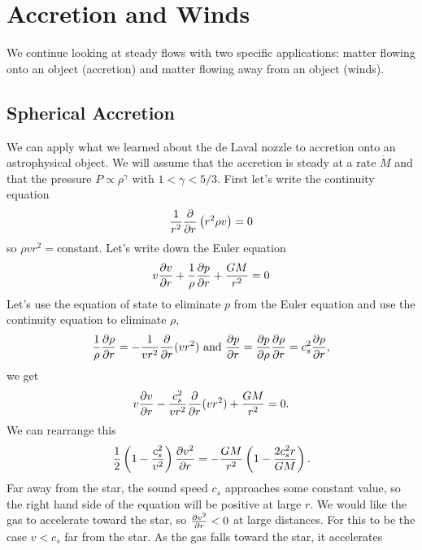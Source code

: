 \chapter{Accretion and Winds}
\label{cha:accretion-winds}
We continue looking at steady flows with two specific applications:
matter flowing onto an object (accretion) and matter flowing away from
an object (winds). 

\section{Spherical Accretion}
\label{sec:spherical-accretion}
We can apply what we learned about the de Laval nozzle to accretion
onto an astrophysical object.  We will assume that the accretion is
steady at a rate ${\dot M}$ and that the pressure $P \propto
\rho^\gamma$ with $1 < \gamma < 5/3$.   First let's write the
continuity equation
\begin{equation}
\frac{1}{r^2} \frac{\partial {}}{\partial {r}} \left ( r^2 \rho v \right ) = 0 
\label{eq:718}
\end{equation}
so $\rho v r^2=$constant.  Let's write down the Euler equation
\begin{equation}
v\frac{\partial {v}}{\partial {r}} + \frac{1}{\rho} \frac{\partial {p}}{\partial {r}} + \frac{GM}{r^2} = 0
\label{eq:719}
\end{equation}
Let's use the equation of state to eliminate $p$ from the Euler
equation and use the continuity equation to eliminate $\rho$,
\begin{equation}
\frac{1}{\rho} \frac{\partial {\rho}}{\partial {r}} = -\frac{1}{vr^2}
\frac{\partial {}}{\partial {r}}(vr^2)~\hbox{\rm and}~\frac{\partial {p}}{\partial {r}} = \frac{\partial {p}}{\partial {\rho}} \frac{\partial {\rho}}{\partial {r}} =
c_s^2 \frac{\partial {\rho}}{\partial {r}},
\label{eq:720}
\end{equation}
we get
\begin{equation}
v\frac{\partial {v}}{\partial {r}} - \frac{c_s^2}{vr^2} \frac{\partial {}}{\partial {r}} (vr^2) + \frac{GM}{r^2} = 0.
\label{eq:721}
\end{equation}
We can rearrange this 
\begin{equation}
\frac{1}{2} \left ( 1 - \frac{c_s^2}{v^2} \right ) \frac{\partial {v^2}}{\partial {r}} =
-\frac{GM}{r^2} \left ( 1 - \frac{2c_s^2 r}{GM} \right ).
\label{eq:722}
\end{equation}
Far away from the star, the sound speed $c_s$ approaches some constant
value, so the right hand side of the equation will be positive at
large $r$.  We would like the gas to accelerate toward the star, so
$\frac{\partial {v^2}}{\partial {r}} < 0$ at large distances.  For this to be the case $v<c_s$
far from the star.   As the gas falls toward the star, it accelerates

